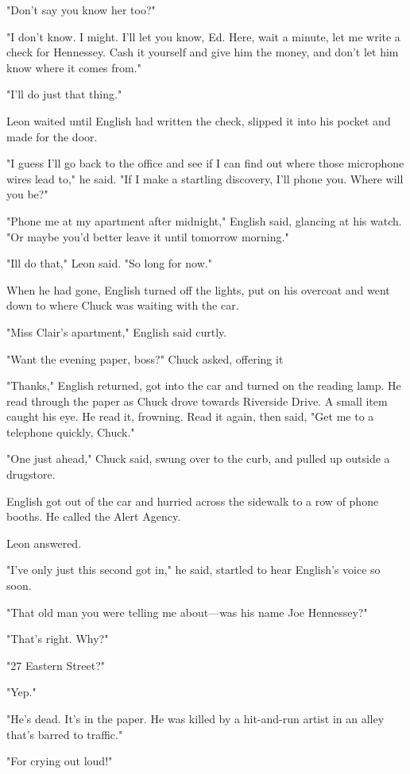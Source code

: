 \documentclass{novel}
\begin{document}
"Don't say you know her too?"

"I don't know. I might. I'll let you know, Ed. Here, wait a minute, let me write a check for Hennessey. Cash it yourself and give him the money, and don't let him know where it comes from."

"I'll do just that thing."

Leon waited until English had written the check, slipped it into his pocket and made for the door.

"I guess I'll go back to the office and see if I can find out where those microphone wires lead to," he said. "If I make a startling discovery, I'll phone you. Where will you be?"

"Phone me at my apartment after midnight," English said, glancing at his watch. "Or maybe you'd better leave it until tomorrow morning."

"Ill do that," Leon said. "So long for now."

When he had gone, English turned off the lights, put on his overcoat and went down to where Chuck was waiting with the car.

"Miss Clair's apartment," English said curtly.

"Want the evening paper, boss?" Chuck asked, offering it

"Thanks," English returned, got into the car and turned on the reading lamp. He read through the paper as Chuck drove towards Riverside Drive. A small item caught his eye. He read it, frowning. Read it again, then said, "Get me to a telephone quickly, Chuck."

"One just ahead," Chuck said, swung over to the curb, and pulled up outside a drugstore.

English got out of the car and hurried across the sidewalk to a row of phone booths. He called the Alert Agency.

Leon answered.

"I've only just this second got in," he said, startled to hear English's voice so soon.

"That old man you were telling me about—was his name Joe Hennessey?"

"That's right. Why?"

"27 Eastern Street?"

"Yep."

"He's dead. It's in the paper. He was killed by a hit-and-run artist in an alley that's barred to traffic."

"For crying out loud!"
\end{document}
